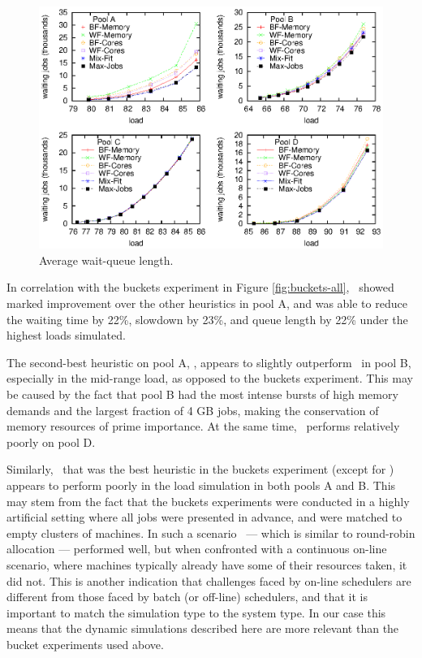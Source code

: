 \begin{figure}\centering
	\includegraphics[width=1.0\textwidth]{figures/avg-waitqueue-with-max-jobs.eps}
\caption{Average wait-queue length.}
\label{fig:avg-waitqueue-with-max-jobs}
\end{figure}

In correlation with the buckets experiment in Figure \ref{fig:buckets-all}, 
\mif\ showed marked improvement over the other heuristics in pool A, 
and was able to reduce the waiting time by 22\%, slowdown by 23\%, and queue
length by 22\% under the highest loads simulated.


The second-best heuristic on pool A, \bfm, appears to slightly outperform \mif\ 
in pool B, especially in the mid-range load, as opposed to the buckets
experiment.
This may be caused by the fact that pool B had the most intense bursts
of high memory demands and the largest fraction of 4 GB jobs, making
the conservation of memory resources of prime importance.
At the same time, \bfm\ performs relatively poorly on pool D.

Similarly, \wfc\ that was the best heuristic in the buckets experiment
(except for \mif) appears to perform poorly in the load simulation in
both pools A and B.
This may stem from the fact that the buckets experiments were 
conducted in a highly artificial setting where all jobs were presented
in advance, and were matched to empty clusters of machines.
In such a scenario \wfc\ --- which is similar to round-robin
allocation --- performed well, but when confronted with a continuous
on-line scenario, where machines typically already have some of their
resources taken, it did not.
This is another indication that challenges faced by on-line schedulers are
different from those faced by batch (or off-line) schedulers, and that
it is important to match the simulation type to the system type.
In our case this means that the dynamic simulations described here are
more relevant than the bucket experiments used above.

